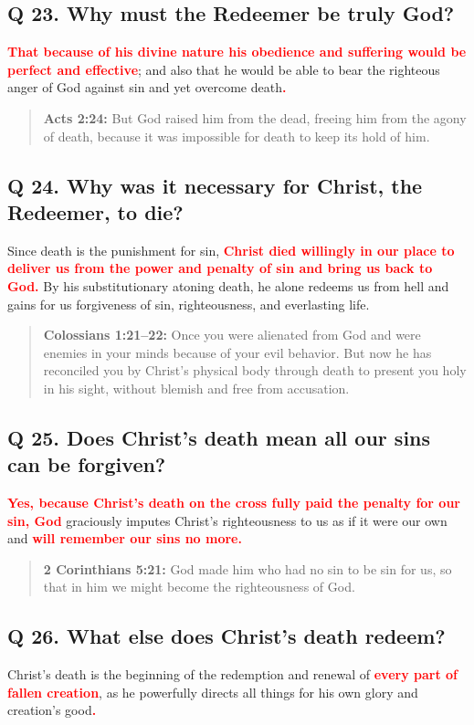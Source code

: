 \documentclass[titlepage]{memoir}
\newcommand\Children[1]{\textbf{\textcolor{red}{#1}}}
\newcommand\Quote[2]{\begin{quote}{\small\textbf{#1:}{ #2}}\end{quote}}
\begin{document}
\subsection{Q 23. Why must the Redeemer be truly God?}
\Children{That because of his divine nature his obedience and suffering would be perfect and effective}; and also that he would be able to bear the righteous anger of God against sin and yet overcome death\Children{.}

\Quote{Acts 2:24}{But God raised him from the dead, freeing him from the agony of death, because it was impossible for death to keep its hold of him.}

\subsection{Q 24. Why was it necessary for Christ, the Redeemer, to die?}
Since death is the punishment for sin, \Children{Christ died willingly in our place to deliver us from the power and penalty of sin and bring us back to God.} By his substitutionary atoning death, he alone redeems us from hell and gains for us forgiveness of sin, righteousness, and everlasting life.

\Quote{Colossians 1:21--22}{Once you were alienated from God and were enemies in your minds because of your evil behavior. But now he has reconciled you by Christ's physical body through death to present you holy in his sight, without blemish and free from accusation.}

\subsection{Q 25. Does Christ's death mean all our sins can be forgiven?}
\Children{Yes, because Christ's death on the cross fully paid the penalty for our sin, God} graciously imputes Christ's righteousness to us as if it were our own and \Children{will remember our sins no more.}

\Quote{2 Corinthians 5:21}{God made him who had no sin to be sin for us, so that in him we might become the righteousness of God.}

\subsection{Q 26. What else does Christ's death redeem?}
Christ's death is the beginning of the redemption and renewal of \Children{every part of fallen creation}, as he powerfully directs all things for his own glory and creation's good\Children{.}
\end{document}
